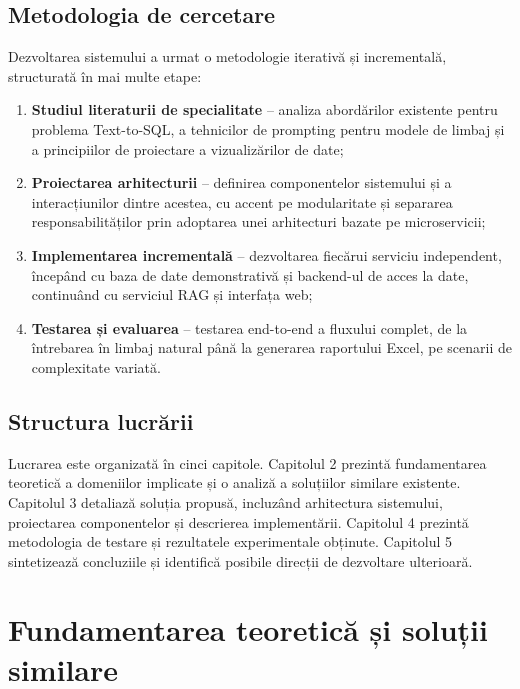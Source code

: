 \documentclass[12pt, a4paper]{report}
\begin{document}
\section{Metodologia de cercetare}

Dezvoltarea sistemului a urmat o metodologie iterativă și incrementală, structurată în mai multe etape:

\begin{enumerate}[nosep]
  \item \textbf{Studiul literaturii de specialitate} -- analiza abordărilor existente pentru problema Text-to-SQL, a tehnicilor de prompting pentru modele de limbaj și a principiilor de proiectare a vizualizărilor de date;
  \item \textbf{Proiectarea arhitecturii} -- definirea componentelor sistemului și a interacțiunilor dintre acestea, cu accent pe modularitate și separarea responsabilităților prin adoptarea unei arhitecturi bazate pe microservicii;
  \item \textbf{Implementarea incrementală} -- dezvoltarea fiecărui serviciu independent, începând cu baza de date demonstrativă și backend-ul de acces la date, continuând cu serviciul RAG și interfața web;
  \item \textbf{Testarea și evaluarea} -- testarea end-to-end a fluxului complet, de la întrebarea în limbaj natural până la generarea raportului Excel, pe scenarii de complexitate variată.
\end{enumerate}

\section{Structura lucrării}

Lucrarea este organizată în cinci capitole. Capitolul 2 prezintă fundamentarea teoretică a domeniilor implicate și o analiză a soluțiilor similare existente. Capitolul 3 detaliază soluția propusă, incluzând arhitectura sistemului, proiectarea componentelor și descrierea implementării. Capitolul 4 prezintă metodologia de testare și rezultatele experimentale obținute. Capitolul 5 sintetizează concluziile și identifică posibile direcții de dezvoltare ulterioară.


\chapter{Fundamentarea teoretică și soluții similare}
\end{document}

